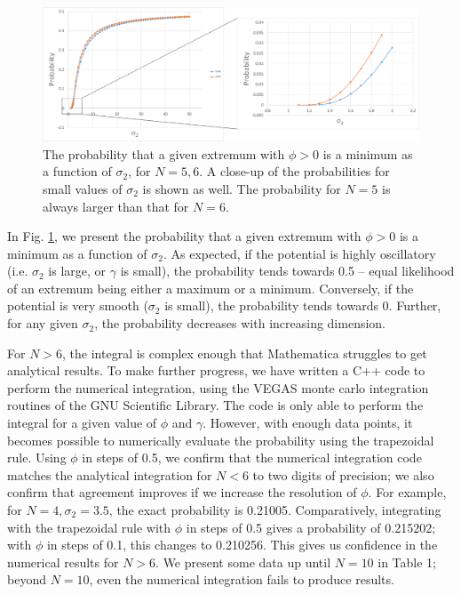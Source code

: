 \documentclass[12pt]{article}
\begin{document}
\begin{figure}
  \centering
  \includegraphics[width=\linewidth]{N6minima.png}
  \caption{The probability that a given extremum with $\phi > 0$ is a minimum as a function of $\sigma_2$, for $N=5,6$. A close-up of the probabilities for small values of $\sigma_2$ is shown as well. The probability for $N=5$ is always larger than that for $N=6$.}
  \label{N6}
\end{figure}

In Fig. \ref{N6}, we present the probability that a given extremum with $\phi > 0$ is a minimum as a function of $\sigma_2$. As expected, if the potential is highly oscillatory (i.e. $\sigma_2$ is large, or $\gamma$ is small), the probability tends towards 0.5 -- equal likelihood of an extremum being either a maximum or a minimum. Conversely, if the potential is very smooth ($\sigma_2$ is small), the probability tends towards 0. Further, for any given $\sigma_2$, the probability decreases with increasing dimension.

For $N > 6$, the integral is complex enough that Mathematica struggles to get analytical results. To make further progress, we have written a C++ code to perform the numerical integration, using the VEGAS \cite{VEGAS} monte carlo integration routines of the GNU Scientific Library.\cite{GSL} The code is only able to perform the integral for a given value of $\phi$ and $\gamma$. However, with enough data points, it becomes possible to numerically evaluate the probability using the trapezoidal rule. Using $\phi$ in steps of 0.5, we confirm that the numerical integration code matches the analytical integration for $N < 6$ to two digits of precision; we also confirm that agreement improves if we increase the resolution of $\phi$. For example, for $N=4, \sigma_2=3.5$, the exact probability is 0.21005. Comparatively, integrating with the trapezoidal rule with $\phi$ in steps of 0.5 gives a probability of 0.215202; with $\phi$ in steps of 0.1, this changes to 0.210256. This gives us confidence in the numerical results for $N > 6$. We present some data up until $N = 10$ in Table 1; beyond $N = 10$, even the numerical integration fails to produce results.
\end{document}
